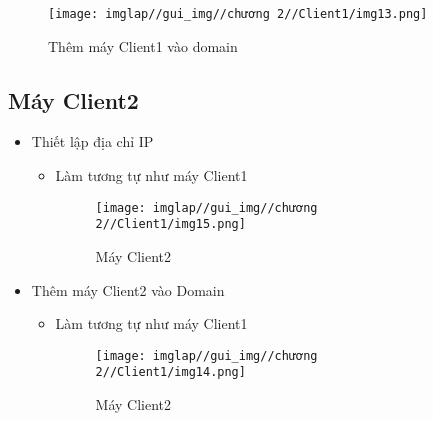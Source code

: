 \documentclass[13pt]{article}
\begin{document}
\begin{itemize}
\begin{itemize}
                        \begin{figure}[H]
                            \centering
                            \texttt{[image: imglap//gui\_img//chương 2//Client1/img13.png]}
                            \caption{Thêm máy Client1 vào domain}
                            \label{fig:enter-label}
                        \end{figure}

                        \end{itemize}
                \end{itemize}
                    
            
            \subsection{Máy Client2}
                \begin{itemize}
                    \item Thiết lập địa chỉ IP
                        \begin{itemize}
                            \item Làm tương tự như máy Client1
                            \begin{figure}[H]
                                \centering
                                \texttt{[image: imglap//gui\_img//chương 2//Client1/img15.png]}
                                \caption{Máy Client2}
                                \label{fig:enter-label}
                            \end{figure}

                        \end{itemize}
                 \end{itemize}

                 \begin{itemize}
                    \item Thêm máy Client2 vào Domain
                        \begin{itemize}
                            \item Làm tương tự như máy Client1

                                \begin{figure}[H]
                                    \centering
                                    \texttt{[image: imglap//gui\_img//chương 2//Client1/img14.png]}
                                    \caption{Máy Client2}
                                    \label{fig:enter-label}
                                \end{figure}

                        \end{itemize}
                 \end{itemize}
    \newpage
\end{document}
